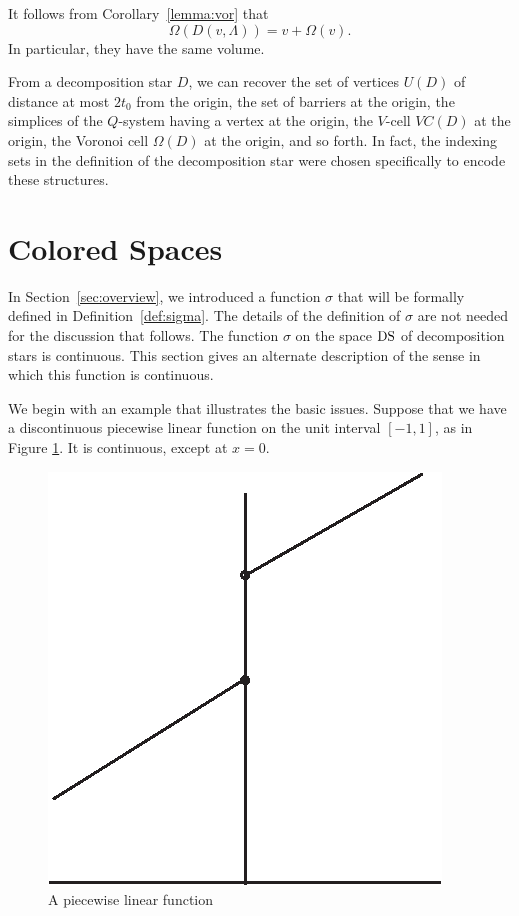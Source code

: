 \begin{remark}
It follows from Corollary~\ref{lemma:vor} that
   $$\Omega(D(v,\Lambda)) = v + \Omega(v).$$
In particular, they have the same volume.
\end{remark}

\begin{remark} From a decomposition star $D$, we can recover
the set of vertices $U(D)$
of distance at most $2t_0$ from the origin, the set of barriers at
the origin, the simplices of the $Q$-system having a vertex at the
origin, the $V$-cell $VC(D)$ at the origin, the Voronoi cell
$\Omega(D)$ at the origin, and so forth.  In fact, the indexing
sets in the definition of the decomposition star were chosen
specifically to encode these structures.
\end{remark}

\section{Colored Spaces} \label{app:coloredspace}




In Section~\ref{sec:overview}, we introduced a function $\sigma$
 that will be formally defined in
Definition~\ref{def:sigma}. The details of the definition of
$\sigma$ are not needed for the discussion that follows.  The
function $\sigma$ on the space ${\operatorname{DS}}$ of decomposition stars is
continuous. This section gives an alternate description of the
sense in which this function is continuous.

We begin with an example that illustrates the basic issues.
Suppose that we have a discontinuous piecewise linear function on
the unit interval $[-1,1]$, as in Figure \ref{fig:discontinuous}.
It is continuous, except at $x=0$.
\begin{figure}[htb]
  \centering
  \includegraphics{PS/linear.eps}
  \caption{A piecewise linear function}
  \label{fig:discontinuous}
\end{figure}



